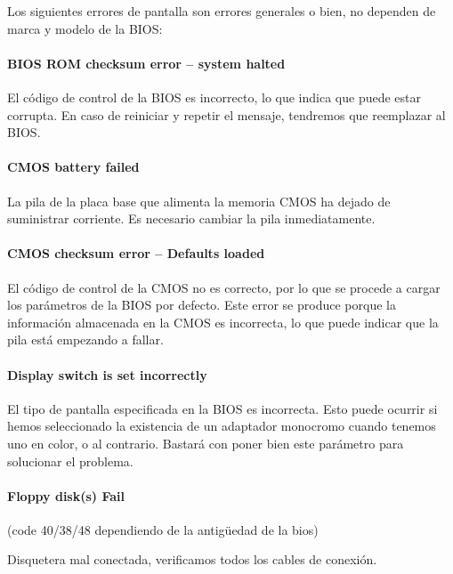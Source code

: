\documentclass[12pt,oneside,a4paper]{article}
\begin{document}
		Los siguientes errores de pantalla son errores generales o bien, no dependen de marca y modelo de la BIOS:

			\paragraph{BIOS ROM checksum error – system halted}

			El código de control de la BIOS es incorrecto, lo que indica que puede
			estar corrupta. En caso de reiniciar y repetir el mensaje, tendremos
			que reemplazar al BIOS.

			\paragraph{CMOS battery failed}

			La pila de la placa base que alimenta la memoria CMOS ha dejado de
			suministrar corriente. Es necesario cambiar la pila inmediatamente.

			\paragraph{CMOS checksum error – Defaults loaded}

			El código de control de la CMOS no es correcto, por lo que se
			procede a cargar los parámetros de la BIOS por defecto. Este error
			se produce porque la información almacenada en la CMOS es
			incorrecta, lo que puede indicar que la pila está empezando a
			fallar.

			\paragraph{Display switch is set incorrectly}

			El tipo de pantalla especificada en la BIOS es incorrecta. Esto puede ocurrir si hemos seleccionado la existencia de un adaptador monocromo cuando tenemos uno en color, o al contrario. Bastará con poner bien este parámetro para solucionar el problema.

			\paragraph{Floppy disk(s) Fail} 
			
			(code 40/38/48 dependiendo de la antigüedad de la bios)

			Disquetera mal conectada, verificamos todos los cables de conexión.
\end{document}
